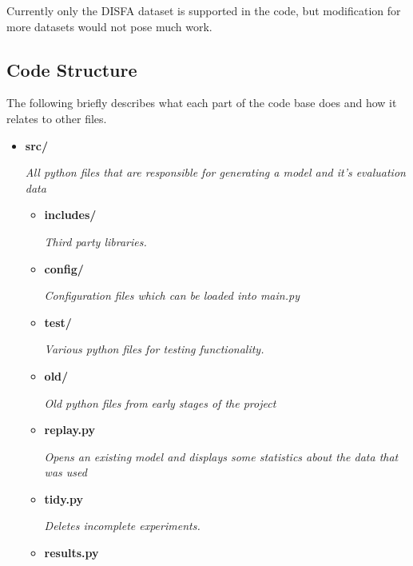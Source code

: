     Currently only the DISFA dataset is supported in the code, but modification for more datasets would not pose much work.



    \subsection{Code Structure} \label{sec:codestruct}
      The following briefly describes what each part of the code base does and how it relates
      to other files.
      {\small
      \begin{itemize}
        \item   {\bf src/}
                \begin{sloppypar} \textit{All python files that are responsible for generating a model and it's evaluation data}\end{sloppypar}
                \begin{itemize}
                  \item {\bf includes/ }
                  \begin{sloppypar} \textit{Third party libraries.}\end{sloppypar}
                  \item {\bf config/ }
                  \begin{sloppypar} \textit{Configuration files which can be loaded into main.py}\end{sloppypar}
                  \item {\bf test/ }
                  \begin{sloppypar} \textit{Various python files for testing functionality.}\end{sloppypar}
                  \item {\bf old/ }
                  \begin{sloppypar} \textit{Old python files from early stages of the project}\end{sloppypar}
                  \item {\bf replay.py }
                  \begin{sloppypar} \textit{Opens an existing model and displays some statistics about the data that was used}\end{sloppypar}
                  \item {\bf tidy.py }
                  \begin{sloppypar} \textit{Deletes incomplete experiments.}\end{sloppypar}
                  \item {\bf results.py }

\end{itemize}
\end{itemize}}
